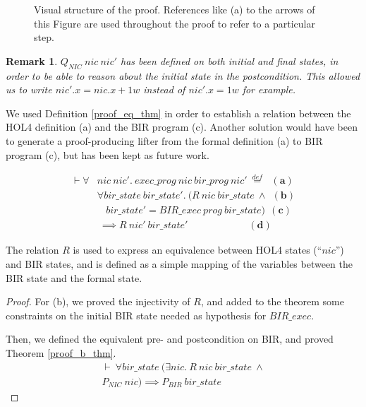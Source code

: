 \documentclass[10pt,a4paper]{article}
\newcommand{\eqdef}{\stackrel{def}{=}}
\newtheorem{remark}{Remark}
\begin{document}
\begin{multicols}{2}
\begin{figure}[H]
	\centering
	\caption{Visual structure of the proof. References like (a) to the arrows of this Figure are used throughout the proof to refer to a particular step.}
	\label{proof_schema}
\end{figure}
%
\begin{remark} \label{remark_Q_nic_intial_final}
$Q_{NIC}~nic~nic'$ has been defined on both initial and final states, in order to be able to reason about the initial state in the postcondition. This allowed us to write $nic'.x = nic.x + 1w$ instead of $nic'.x = 1w$ for example.
\end{remark}
%
\par We used Definition \ref{proof_eq_thm} in order to establish a relation between the HOL4 definition (a) and the BIR program (c). Another solution would have been to generate a proof-producing lifter from the formal definition (a) to BIR program (c), but has been kept as future work.
%
\begin{small}
  \begin{equation}
  \begin{split}
    \vdash \forall &nic~nic'.~exec\_prog~nic~bir\_prog~nic'~\eqdef ~~\, \mathbf{(a)}\\
      &\forall bir\_state~bir\_state'.~(R~nic~bir\_state~\land ~~ \mathbf{(b)}\\
            &~~~~bir\_state' = BIR\_exec~prog~bir\_state) ~~ \mathbf{(c)}\\
            &~\implies R~nic'~bir\_state' ~~~~~~~~~~~~~~~~~~~~~~~~~~~\, \mathbf{(d)}
  \end{split}
  \label{proof_eq_thm}
  \end{equation}
\end{small}
%
\vspace{-5pt}
\par The relation $R$ is used to express an equivalence between HOL4 states (``$nic$'') and BIR states, and is defined as a simple mapping of the variables between the BIR state and the formal state.

\begin{proof}

For (b), we proved the injectivity of $R$, and added to the theorem some constraints on the initial BIR state needed as hypothesis for $BIR\_exec$.

Then, we defined the equivalent pre- and postcondition on BIR, and proved Theorem \ref{proof_b_thm}.
%
\begin{equation} \label{proof_b_thm}
  \begin{split}
  \vdash~\forall bir\_state~(\exists nic.~R~nic~bir\_state~\land\\
  P_{NIC}~nic) \implies P_{BIR}~bir\_state
  \end{split}
\end{equation}


\end{proof}
\end{multicols}
\end{document}
